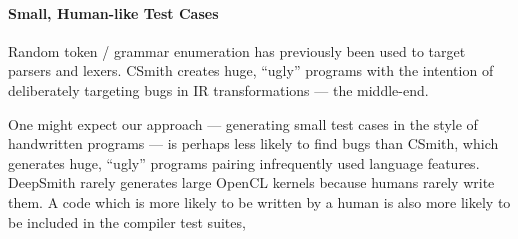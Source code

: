 \paragraph{Small, Human-like Test Cases} Random token / grammar enumeration has previously been used to target parsers and lexers. CSmith creates huge, ``ugly'' programs with the intention of deliberately targeting bugs in IR transformations --- the middle-end.

One might expect our approach --- generating small test cases in the style of handwritten programs --- is perhaps less likely to find bugs than CSmith, which generates huge, ``ugly'' programs pairing infrequently used language features. DeepSmith rarely generates large OpenCL kernels because humans rarely write them. A code which is more likely to be written by a human is also more likely to be included in the compiler test suites, 